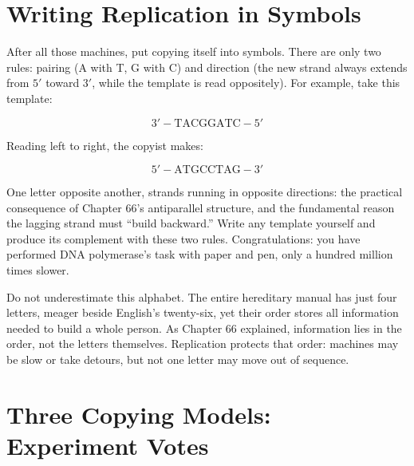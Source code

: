 \section{Writing Replication in Symbols}

After all those machines, put copying itself into symbols. There are only two rules: pairing (A with T, G with C) and direction (the new strand always extends from $5'$ toward $3'$, while the template is read oppositely). For example, take this template:

\[3'-\mathrm{TACGGATC}-5'\]

Reading left to right, the copyist makes:

\[5'-\mathrm{ATGCCTAG}-3'\]

One letter opposite another, strands running in opposite directions: the practical consequence of Chapter 66's antiparallel structure, and the fundamental reason the lagging strand must ``build backward.'' Write any template yourself and produce its complement with these two rules. Congratulations: you have performed DNA polymerase's task with paper and pen, only a hundred million times slower.

Do not underestimate this alphabet. The entire hereditary manual has just four letters, meager beside English's twenty-six, yet their order stores all information needed to build a whole person. As Chapter 66 explained, information lies in the order, not the letters themselves. Replication protects that order: machines may be slow or take detours, but not one letter may move out of sequence.

\section{Three Copying Models: Experiment Votes}

